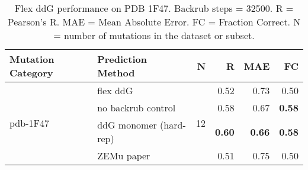 \begin{table}
  \begin{tabular}{llrrrr}
\toprule
Mutation Category &       Prediction Method &   N &    R &  MAE &   FC \\
\midrule
 \multirow{ 4}{*}{pdb-1F47} & flex ddG & \multirow{ 4}{*}{12} & 0.52 & 0.73 & 0.50  \\
 & no backrub control & & 0.58 & 0.67 & \textbf{0.58}  \\
 & ddG monomer (hard-rep) & & \textbf{0.60} & \textbf{0.66} & \textbf{0.58}  \\
 & ZEMu paper & & 0.51 & 0.75 & 0.50  \\
\bottomrule
\end{tabular}
  \caption[Flex ddG performance on PDB 1F47]{
    Flex ddG performance on PDB 1F47. Backrub steps = 32500. R = Pearson's R. MAE = Mean Absolute Error. FC = Fraction Correct. N = number of mutations in the dataset or subset.
  } \label{tab:table-pdb-1F47}
\end{table}
